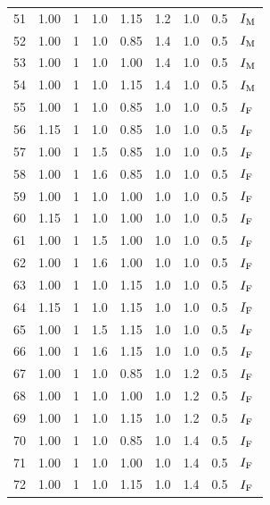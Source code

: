 \begin{longtable}[t]{lllllllll}
51 & 1.00 & 1 & 1.0 & 1.15 & 1.2 & 1.0 & 0.5 & $I_{{\rm M}}$\\
52 & 1.00 & 1 & 1.0 & 0.85 & 1.4 & 1.0 & 0.5 & $I_{{\rm M}}$\\
53 & 1.00 & 1 & 1.0 & 1.00 & 1.4 & 1.0 & 0.5 & $I_{{\rm M}}$\\
54 & 1.00 & 1 & 1.0 & 1.15 & 1.4 & 1.0 & 0.5 & $I_{{\rm M}}$\\
55 & 1.00 & 1 & 1.0 & 0.85 & 1.0 & 1.0 & 0.5 & $I_{{\rm F}}$\\
56 & 1.15 & 1 & 1.0 & 0.85 & 1.0 & 1.0 & 0.5 & $I_{{\rm F}}$\\
57 & 1.00 & 1 & 1.5 & 0.85 & 1.0 & 1.0 & 0.5 & $I_{{\rm F}}$\\
58 & 1.00 & 1 & 1.6 & 0.85 & 1.0 & 1.0 & 0.5 & $I_{{\rm F}}$\\
59 & 1.00 & 1 & 1.0 & 1.00 & 1.0 & 1.0 & 0.5 & $I_{{\rm F}}$\\
60 & 1.15 & 1 & 1.0 & 1.00 & 1.0 & 1.0 & 0.5 & $I_{{\rm F}}$\\
61 & 1.00 & 1 & 1.5 & 1.00 & 1.0 & 1.0 & 0.5 & $I_{{\rm F}}$\\
62 & 1.00 & 1 & 1.6 & 1.00 & 1.0 & 1.0 & 0.5 & $I_{{\rm F}}$\\
63 & 1.00 & 1 & 1.0 & 1.15 & 1.0 & 1.0 & 0.5 & $I_{{\rm F}}$\\
64 & 1.15 & 1 & 1.0 & 1.15 & 1.0 & 1.0 & 0.5 & $I_{{\rm F}}$\\
65 & 1.00 & 1 & 1.5 & 1.15 & 1.0 & 1.0 & 0.5 & $I_{{\rm F}}$\\
66 & 1.00 & 1 & 1.6 & 1.15 & 1.0 & 1.0 & 0.5 & $I_{{\rm F}}$\\
67 & 1.00 & 1 & 1.0 & 0.85 & 1.0 & 1.2 & 0.5 & $I_{{\rm F}}$\\
68 & 1.00 & 1 & 1.0 & 1.00 & 1.0 & 1.2 & 0.5 & $I_{{\rm F}}$\\
69 & 1.00 & 1 & 1.0 & 1.15 & 1.0 & 1.2 & 0.5 & $I_{{\rm F}}$\\
70 & 1.00 & 1 & 1.0 & 0.85 & 1.0 & 1.4 & 0.5 & $I_{{\rm F}}$\\
71 & 1.00 & 1 & 1.0 & 1.00 & 1.0 & 1.4 & 0.5 & $I_{{\rm F}}$\\
72 & 1.00 & 1 & 1.0 & 1.15 & 1.0 & 1.4 & 0.5 & $I_{{\rm F}}$\\
\bottomrule
\end{longtable}